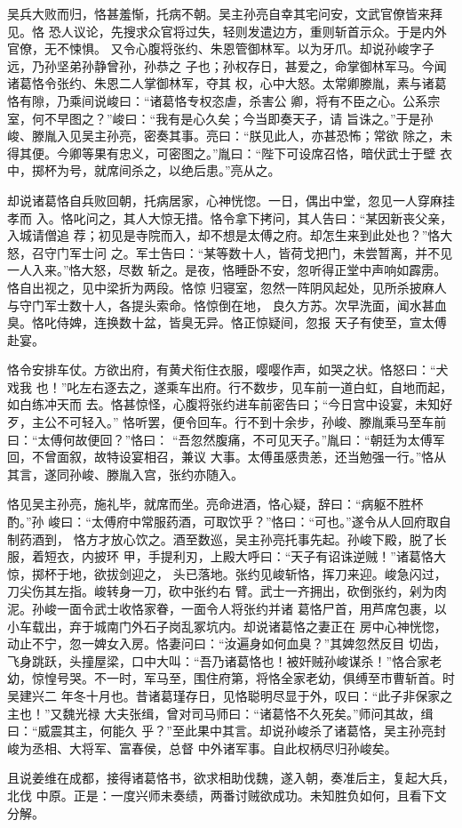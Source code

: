 吴兵大败而归，恪甚羞惭，托病不朝。吴主孙亮自幸其宅问安，文武官僚皆来拜见。恪
恐人议论，先搜求众官将过失，轻则发遣边方，重则斩首示众。于是内外官僚，无不悚惧。
又令心腹将张约、朱恩管御林军。以为牙爪。却说孙峻字子远，乃孙坚弟孙静曾孙，孙恭之
子也；孙权存日，甚爱之，命掌御林军马。今闻诸葛恪令张约、朱恩二人掌御林军，夺其
权，心中大怒。太常卿滕胤，素与诸葛恪有隙，乃乘间说峻曰：“诸葛恪专权恣虐，杀害公
卿，将有不臣之心。公系宗室，何不早图之？”峻曰：“我有是心久矣；今当即奏天子，请
旨诛之。”于是孙峻、滕胤入见吴主孙亮，密奏其事。亮曰：“朕见此人，亦甚恐怖；常欲
除之，未得其便。今卿等果有忠义，可密图之。”胤曰：“陛下可设席召恪，暗伏武士于壁
衣中，掷杯为号，就席间杀之，以绝后患。”亮从之。

却说诸葛恪自兵败回朝，托病居家，心神恍惚。一日，偶出中堂，忽见一人穿麻挂孝而
入。恪叱问之，其人大惊无措。恪令拿下拷问，其人告曰：“某因新丧父亲，入城请僧追
荐；初见是寺院而入，却不想是太傅之府。却怎生来到此处也？”恪大怒，召守门军士问
之。军士告曰：“某等数十人，皆荷戈把门，未尝暂离，并不见一人入来。”恪大怒，尽数
斩之。是夜，恪睡卧不安，忽听得正堂中声响如霹雳。恪自出视之，见中梁折为两段。恪惊
归寝室，忽然一阵阴风起处，见所杀披麻人与守门军士数十人，各提头索命。恪惊倒在地，
良久方苏。次早洗面，闻水甚血臭。恪叱侍婢，连换数十盆，皆臭无异。恪正惊疑间，忽报
天子有使至，宣太傅赴宴。

恪令安排车仗。方欲出府，有黄犬衔住衣服，嘤嘤作声，如哭之状。恪怒曰：“犬戏我
也！”叱左右逐去之，遂乘车出府。行不数步，见车前一道白虹，自地而起，如白练冲天而
去。恪甚惊怪，心腹将张约进车前密告曰；“今日宫中设宴，未知好歹，主公不可轻入。”
恪听罢，便令回车。行不到十余步，孙峻、滕胤乘马至车前曰：“太傅何故便回？”恪曰：
“吾忽然腹痛，不可见天子。”胤曰：“朝廷为太傅军回，不曾面叙，故特设宴相召，兼议
大事。太傅虽感贵恙，还当勉强一行。”恪从其言，遂同孙峻、滕胤入宫，张约亦随入。

恪见吴主孙亮，施礼毕，就席而坐。亮命进酒，恪心疑，辞曰：“病躯不胜杯酌。”孙
峻曰：“太傅府中常服药酒，可取饮乎？”恪曰：“可也。”遂令从人回府取自制药酒到，
恪方才放心饮之。酒至数巡，吴主孙亮托事先起。孙峻下殿，脱了长服，着短衣，内披环
甲，手提利刃，上殿大呼曰：“天子有诏诛逆贼！”诸葛恪大惊，掷杯于地，欲拔剑迎之，
头已落地。张约见峻斩恪，挥刀来迎。峻急闪过，刀尖伤其左指。峻转身一刀，砍中张约右
臂。武士一齐拥出，砍倒张约，剁为肉泥。孙峻一面令武士收恪家眷，一面令人将张约并诸
葛恪尸首，用芦席包裹，以小车载出，弃于城南门外石子岗乱冢坑内。却说诸葛恪之妻正在
房中心神恍惚，动止不宁，忽一婢女入房。恪妻问曰：“汝遍身如何血臭？”其婢忽然反目
切齿，飞身跳跃，头撞屋梁，口中大叫：“吾乃诸葛恪也！被奸贼孙峻谋杀！”恪合家老
幼，惊惶号哭。不一时，军马至，围住府第，将恪全家老幼，俱缚至市曹斩首。时吴建兴二
年冬十月也。昔诸葛瑾存日，见恪聪明尽显于外，叹曰：“此子非保家之主也！”又魏光禄
大夫张缉，曾对司马师曰：“诸葛恪不久死矣。”师问其故，缉曰：“威震其主，何能久
乎？”至此果中其言。却说孙峻杀了诸葛恪，吴主孙亮封峻为丞相、大将军、富春侯，总督
中外诸军事。自此权柄尽归孙峻矣。

且说姜维在成都，接得诸葛恪书，欲求相助伐魏，遂入朝，奏准后主，复起大兵，北伐
中原。正是：一度兴师未奏绩，两番讨贼欲成功。未知胜负如何，且看下文分解。